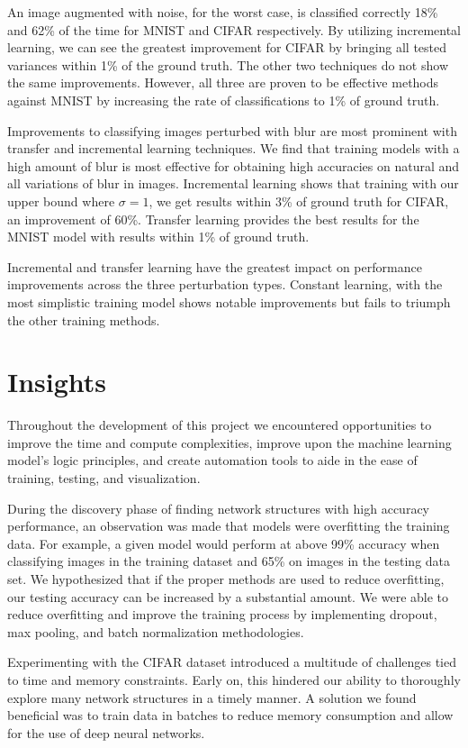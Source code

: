 \documentclass[conference]{IEEEtran}
\begin{document}
An image augmented with noise, for the worst case, is classified correctly 18\% and 62\% of the time for MNIST and CIFAR respectively. By utilizing incremental learning, we can see the greatest improvement for CIFAR by bringing all tested variances within 1\% of the ground truth. The other two techniques do not show the same improvements. However, all three are proven to be effective methods against MNIST by increasing the rate of classifications to 1\% of ground truth.

Improvements to classifying images perturbed with blur are most prominent with transfer and incremental learning techniques. We find that training models with a high amount of blur is most effective for obtaining high accuracies on natural and all variations of blur in images. Incremental learning shows that training with our upper bound where $\sigma=1$, we get results within 3\% of ground truth for CIFAR, an improvement of 60\%. Transfer learning provides the best results for the MNIST model with results within 1\% of ground truth.

Incremental and transfer learning have the greatest impact on performance improvements across the three perturbation types. Constant learning, with the most simplistic training model shows notable improvements but fails to triumph the other training methods.

\section{Insights}

Throughout the development of this project we encountered opportunities to improve the time and compute complexities, improve upon the machine learning model’s logic principles, and create automation tools to aide in the ease of training, testing, and visualization.

During the discovery phase of finding network structures with high accuracy performance, an observation was made that models were overfitting the training data. For example, a given model would perform at above 99\% accuracy when classifying images in the training dataset and 65\% on images in the testing data set. We hypothesized that if the proper methods are used to reduce overfitting, our testing accuracy can be increased by a substantial amount. We were able to reduce overfitting and improve the training process by implementing dropout, max pooling, and batch normalization methodologies.

Experimenting with the CIFAR dataset introduced a multitude of challenges tied to time and memory constraints. Early on, this hindered our ability to thoroughly explore many network structures in a timely manner. A solution we found beneficial was to train data in batches to reduce memory consumption and allow for the use of deep neural networks.
\end{document}
